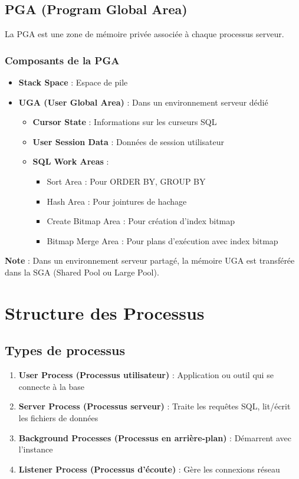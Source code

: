 \documentclass[12pt,a4paper]{article}
\begin{document}
\subsection{PGA (Program Global Area)}

La PGA est une zone de mémoire privée associée à chaque processus serveur.

\subsubsection{Composants de la PGA}

\begin{itemize}
    \item \textbf{Stack Space} : Espace de pile
    \item \textbf{UGA (User Global Area)} : Dans un environnement serveur dédié
    \begin{itemize}
        \item \textbf{Cursor State} : Informations sur les curseurs SQL
        \item \textbf{User Session Data} : Données de session utilisateur
        \item \textbf{SQL Work Areas} :
        \begin{itemize}
            \item Sort Area : Pour ORDER BY, GROUP BY
            \item Hash Area : Pour jointures de hachage
            \item Create Bitmap Area : Pour création d'index bitmap
            \item Bitmap Merge Area : Pour plans d'exécution avec index bitmap
        \end{itemize}
    \end{itemize}
\end{itemize}

\textbf{Note} : Dans un environnement serveur partagé, la mémoire UGA est transférée dans la SGA (Shared Pool ou Large Pool).

\section{Structure des Processus}

\subsection{Types de processus}

\begin{enumerate}
    \item \textbf{User Process (Processus utilisateur)} : Application ou outil qui se connecte à la base
    \item \textbf{Server Process (Processus serveur)} : Traite les requêtes SQL, lit/écrit les fichiers de données
    \item \textbf{Background Processes (Processus en arrière-plan)} : Démarrent avec l'instance
    \item \textbf{Listener Process (Processus d'écoute)} : Gère les connexions réseau
\end{enumerate}
\end{document}
